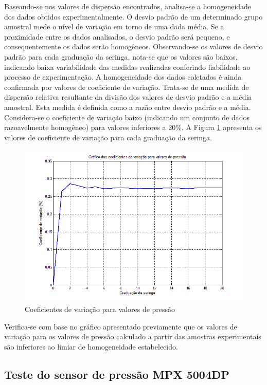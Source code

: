 Baseando-se nos valores de dispersão encontrados, analisa-se a homogeneidade dos dados obtidos experimentalmente. O desvio padrão de um determinado grupo amostral mede o nível de variação em torno de uma dada média. Se a proximidade entre os dados analisados, o desvio padrão será pequeno, e consequentemente os dados serão homogêneos. Observando-se os valores de desvio padrão para cada graduação da seringa, nota-se que os valores são baixos, indicando baixa variabilidade das medidas realizadas conferindo fiabilidade ao processo de experimentação. A homogeneidade dos dados coletados é ainda confirmada por valores de coeficiente de variação. Trata-se de uma medida de dispersão relativa resultante da divisão dos valores de desvio padrão e a média amostral. Esta medida é definida como a razão entre desvio padrão e a média. Considera-se o coeficiente de variação baixo (indicando um conjunto de dados razoavelmente homogêneo) para valores inferiores a 20\%. A Figura \ref{graficocoeficientes} apresenta os valores de coeficiente de variação para cada graduação da seringa.

\begin{figure}[H]
		\centering
			\includegraphics[scale=0.8]{figuras/graficocoeficientes.png}
		\caption{Coeficientes de variação para valores de pressão}
		\label{graficocoeficientes}
\end{figure}

Verifica-se com base no gráfico apresentado previamente que os valores de variação para os valores de pressão calculado a partir das amostras experimentais são inferiores ao limiar de homogeneidade estabelecido. 

\subsection[Teste do sensor de pressão MPX 5004DP]{Teste do sensor de pressão MPX 5004DP}

